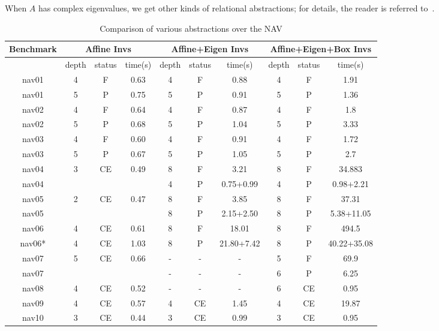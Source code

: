 \documentclass{article}
\begin{document}
When $A$ has complex eigenvalues, we get other kinds of
relational abstractions; for details, the reader is
referred to~\cite{Tiwari03:HSCC}.  

\begin{table}[t]
{\footnotesize \begin{center}
\begin{tabular}{|c||c|c|c||c|c|c||c|c|c|}
\hline
Benchmark & 
\multicolumn{3}{c||}{Affine Invs} & 
\multicolumn{3}{c||}{Affine+Eigen Invs} & 
\multicolumn{3}{c|}{Affine+Eigen+Box Invs}
\\ \hline
 & depth & status & time(s)
 & depth & status & time(s)
 & depth & status & time(s)
\\ \hline\hline
nav01  
& 4 & F & 0.63
& 4 & F & 0.88
& 4 & F & 1.91
\\ 
nav01  
& 5 & P & 0.75
& 5 & P & 0.91
& 5 & P & 1.36
\\ \hline
nav02
& 4 & F & 0.64
& 4 & F & 0.87
& 4 & F & 1.8
\\ 
nav02
& 5 & P & 0.68
& 5 & P & 1.04
& 5 & P & 3.33
\\ \hline
nav03
& 4 & F & 0.60
& 4 & F & 0.91
& 4 & F & 1.72
\\ 
nav03
& 5 & P & 0.67
& 5 & P & 1.05
& 5 & P & 2.7
\\ \hline
nav04
& 3 & CE & 0.49
& 8 & F & 3.21
& 8 & F & 34.883
\\ 
nav04
& & &  
& 4 & P & 0.75+0.99
& 4 & P & 0.98+2.21
\\ \hline
nav05
& 2 & CE & 0.47
& 8 & F & 3.85
& 8 & F & 37.31
\\ 
nav05
& & &
& 8 & P & 2.15+2.50
& 8 & P & 5.38+11.05
\\ \hline
nav06
& 4 & CE & 0.61
& 8 & F & 18.01
& 8 & F & 494.5
\\ 
nav06*
& 4 & CE & 1.03
& 8 & P & 21.80+7.42  
& 8 & P & 40.22+35.08  
\\ \hline
nav07
& 5 & CE & 0.66
& - & - & - 
& 5 & F & 69.9 
\\ 
nav07
& & &
& - & - &- 
& 6 & P & 6.25 
\\ \hline
nav08
& 4 & CE & 0.52
& - & - &- 
& 6 & CE & 0.95
\\ \hline
nav09
& 4 & CE & 0.57
& 4 & CE & 1.45
& 4 & CE & 19.87
\\ \hline
nav10
& 3 & CE & 0.44
& 3 & CE & 0.99
& 3 & CE & 0.95
\\ \hline
\end{tabular}
\end{center}
}
\caption{Comparison of various abstractions over the NAV
}
\end{table}
\end{document}
